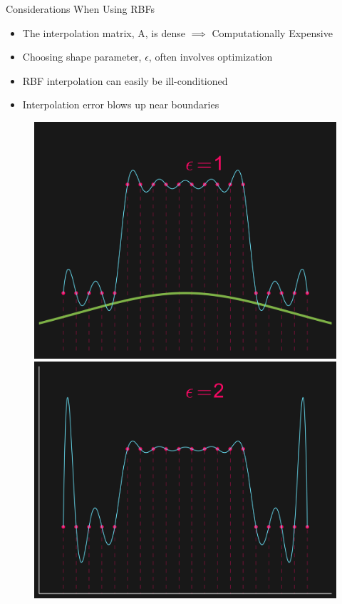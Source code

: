 \documentclass[12pt,t]{beamer}
\newcommand{\bi}{\begin{itemize}}
\newcommand{\ei}{\end{itemize}}
\begin{document}
\begin{frame}{Considerations When Using RBFs}
\bi
\item The interpolation matrix, A, is dense $\implies$ Computationally Expensive
\item Choosing shape parameter, $\epsilon$, often involves optimization
\item RBF interpolation can easily be ill-conditioned
\item Interpolation error blows up near boundaries
\ei

\begin{figure}[!htb]
  \includegraphics[width=\linewidth]{conditioned.png}
\endminipage\hfill
{}
  \includegraphics[width=\linewidth]{illconditioned.png}
\endminipage\
\end{figure}

\note{}
\end{frame}
\end{document}
